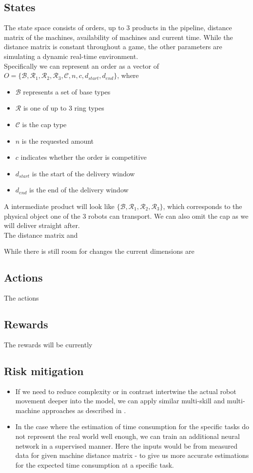 \documentclass[runningheads,envcountsect]{llncs}
\begin{document}
\subsection{States} \label{states}
The state space consists of orders, up to 3 products in the pipeline, distance matrix of the machines, availability of machines and current time. While the distance matrix is constant throughout a game, the other parameters are simulating a dynamic real-time environment.\\
Specifically we can represent an order as a vector of $O=\{\mathcal{B}, \mathcal{R}_1, \mathcal{R}_2, \mathcal{R}_3, \mathcal{C}, n, c, d_{start}, d_{end}  \}$, where
\begin{itemize}
  \item $\mathcal{B}$ represents a set of base types
  \item $\mathcal{R}$ is one of up to 3 ring types
  \item $\mathcal{C}$ is the cap type
  \item $n$ is the requested amount
  \item $c$ indicates whether the order is competitive
  \item $d_{start}$ is the start of the delivery window
  \item $d_{end}$ is the end of the delivery window
\end{itemize}
A intermediate product will look like $\{\mathcal{B}, \mathcal{R}_1, \mathcal{R}_2, \mathcal{R}_3\}$, which corresponds to the physical object one of the 3 robots can transport. We can also omit the cap as we will deliver straight after.\\
The distance matrix and 

While there is still room for changes the current dimensions are 


\subsection{Actions}
The actions 


\subsection{Rewards}
The rewards will be currently 


\subsection{Risk mitigation} \label{risks}
\begin{itemize}
  \item If we need to reduce complexity or in contrast intertwine the actual robot movement deeper into the model, we can apply similar multi-skill and multi-machine approaches as described in \cite{qu2016optimized}.
  \item In the case where the estimation of time consumption for the specific tasks do not represent the real world well enough, we can train an additional neural network in a supervised manner. Here the inputs would be from measured data for given machine distance matrix - to give us more accurate estimations for the expected time consumption at a specific task.
\end{itemize}

\vspace{24pt}



\end{document}
